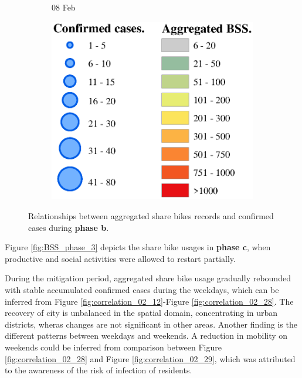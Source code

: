 \documentclass[preprints,ijgi,submit,moreauthors]{Definitions/mdpi}
\begin{document}
\begin{figure}[ht]
\begin{subfigure}{.3\textwidth}
        \caption{08 Feb}
    \end{subfigure}
    \begin{subfigure}{.3\textwidth}
        \includegraphics[width=\textwidth]{Figures/Relation_with_confrimed_cases/legend7.eps}
    \end{subfigure}
    \caption{Relationships between aggregated share bikes records and confirmed cases during \textbf{phase b}.}
    \label{fig:BSS_phase1_2}
\end{figure}

Figure \ref{fig:BSS_phase_3} depicts the share bike usages in \textbf{phase c}, when productive and social activities were allowed to restart partially.

During the mitigation period, aggregated share bike usage gradually rebounded with stable accumulated confirmed cases during the weekdays, which can be inferred from Figure \ref{fig:correlation_02_12}-Figure \ref{fig:correlation_02_28}.
The recovery of city is unbalanced in the spatial domain, concentrating in urban districts, wheras changes are not significant in other areas.
Another finding is the different patterns between weekdays and weekends.
A reduction in mobility on weekends could be inferred from comparison between Figure \ref{fig:correlation_02_28} and Figure \ref{fig:correlation_02_29}, which was attributed to the awareness of the risk of infection of residents.
\end{document}
